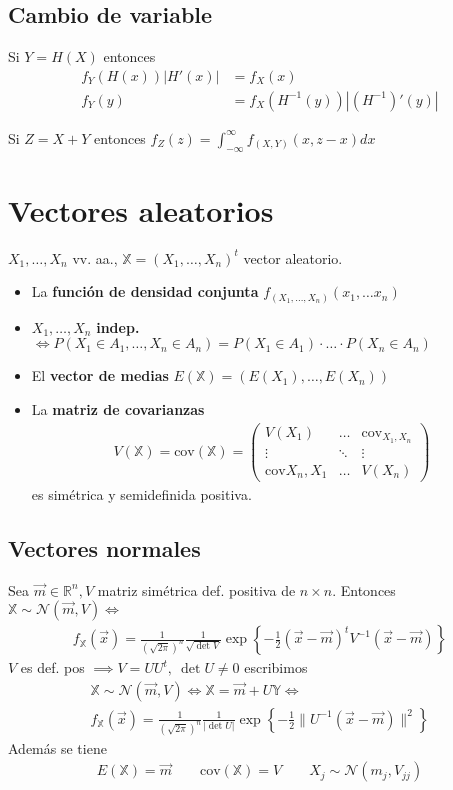 \documentclass[a4paper,twocolumn]{extarticle}
\theoremstyle{remark}
\newcommand{\X}{\mathbb{X}}
\newcommand{\R}{\mathbb{R}}
\newcommand{\normal}{\mathcal{N}}
\newcommand{\cov}{\text{cov}}
\begin{document}
\subsection{Cambio de variable}

Si $Y = H(X)$ entonces
\begin{align*}
	f_Y(H(x))|H'(x)| &= f_X(x)\\
	f_Y(y) &= f_X(H^{-1}(y))|(H^{-1})'(y)|
\end{align*}

Si $Z = X+Y$ entonces $f_Z(z) = \int_{-\infty}^{\infty} f_{(X,Y)}(x, z-x) dx$

\section{Vectores aleatorios}
$X_1, \dots, X_n$ vv. aa., $\mathbb{X} = (X_1, \dots, X_n)^t$ vector aleatorio.
\begin{itemize}
	\item La \textbf{función de densidad conjunta} $f_{(X_1, \dots, X_n)}(x_1, \dots x_n)$
	\item $X_1, \dots, X_n$ \textbf{indep.} $\iff P(X_1 \in A_1, \dots, X_n \in A_n) = P(X_1 \in A_1)\cdot\dots \cdot P(X_n \in A_n)$
	\item El \textbf{vector de medias} $E(\X) = (E(X_1), \dots, E(X_n))$
	\item La \textbf{matriz de covarianzas}
	\begin{align*}
		V(\X) = \cov(\X) = \left(\begin{array}{ccc}
		V(X_1) & \dots & \cov_{X_1,X_n} \\
		\vdots & \ddots & \vdots \\
		\cov{X_n, X_1} & \dots & V(X_n)
		\end{array}\right)
	\end{align*}
	es simétrica y semidefinida positiva.
\end{itemize}

\subsection{Vectores normales}

Sea $\vec{m} \in \R^n, V$ matriz simétrica def. positiva de $n\times n$. Entonces $\X \sim \normal(\vec{m}, V) \iff$
\begin{align*}
f_{\X}(\vec{x}) = \frac{1}{(\sqrt{2\pi})^n}\frac{1}{\sqrt{\det V}} \exp\left\lbrace -\frac{1}{2}(\vec{x} - \vec{m})^t V^{-1} (\vec{x} - \vec{m})\right\rbrace
\end{align*}
$V$ es def. pos $\implies V = UU^t,\ \det U \neq 0$ escribimos
\begin{align*}
\X \sim \normal(\vec{m}, V) \iff \X = \vec{m} + U\mathbb{Y} \iff \\
f_{\X}(\vec{x}) = \frac{1}{(\sqrt{2\pi})^n}\frac{1}{|\det U|} \exp\left\lbrace -\frac{1}{2}\lVert U^{-1} (\vec{x} - \vec{m})\rVert^2\right\rbrace
\end{align*}
Además se tiene
\begin{align*}E(\X) = \vec{m}\qquad \cov(\X) = V \qquad X_j \sim \normal(m_j, V_{jj})
\end{align*}
\end{document}
